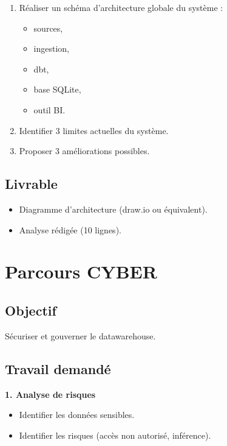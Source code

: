 \documentclass[11pt,a4paper]{article}
\begin{document}
\begin{enumerate}
  \item Réaliser un schéma d’architecture globale du système :
  \begin{itemize}
    \item sources,
    \item ingestion,
    \item dbt,
    \item base SQLite,
    \item outil BI.
  \end{itemize}
  \item Identifier 3 limites actuelles du système.
  \item Proposer 3 améliorations possibles.
\end{enumerate}

\subsection*{Livrable}

\begin{itemize}
  \item Diagramme d’architecture (draw.io ou équivalent).
  \item Analyse rédigée (10 lignes).
\end{itemize}

\section*{Parcours CYBER}

\subsection*{Objectif}

Sécuriser et gouverner le datawarehouse.

\subsection*{Travail demandé}

\textbf{1. Analyse de risques}

\begin{itemize}
  \item Identifier les données sensibles.
  \item Identifier les risques (accès non autorisé, inférence).
\end{itemize}
\end{document}
